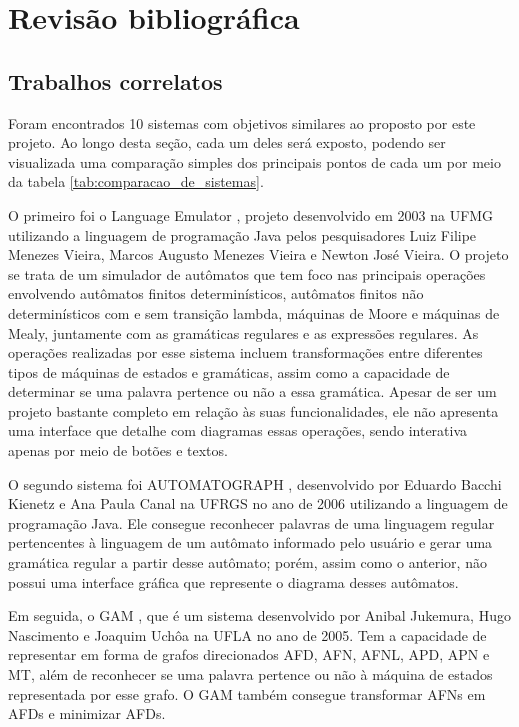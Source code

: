 \chapter{Revisão bibliográfica}
\label{cap:revisao}

\section{Trabalhos correlatos}

Foram encontrados 10 sistemas com objetivos similares ao proposto por este projeto. Ao longo desta seção, cada um deles será exposto, podendo ser visualizada uma comparação simples dos principais pontos de cada um por meio da tabela \ref{tab:comparacao_de_sistemas}.

O primeiro foi o Language Emulator \cite{LanguageEmulator}, projeto desenvolvido em 2003 na UFMG utilizando a linguagem de programação Java pelos pesquisadores Luiz Filipe Menezes Vieira, Marcos Augusto Menezes Vieira e Newton José Vieira. O projeto se trata de um simulador de autômatos que tem foco nas principais operações envolvendo autômatos finitos determinísticos, autômatos finitos não determinísticos com e sem transição lambda, máquinas de Moore e máquinas de Mealy, juntamente com as gramáticas regulares e as expressões regulares. As operações realizadas por esse sistema incluem transformações entre diferentes tipos de máquinas de estados e gramáticas, assim como a capacidade de determinar se uma palavra pertence ou não a essa gramática. Apesar de ser um projeto bastante completo em relação às suas funcionalidades, ele não apresenta uma interface que detalhe com diagramas essas operações, sendo interativa apenas por meio de botões e textos.

O segundo sistema foi AUTOMATOGRAPH \cite{AUTOMATOGRAPH}, desenvolvido por Eduardo Bacchi Kienetz e Ana Paula Canal na UFRGS no ano de 2006 utilizando a linguagem de programação Java. Ele consegue reconhecer palavras de uma linguagem regular pertencentes à linguagem de um autômato informado pelo usuário e gerar uma gramática regular a partir desse autômato; porém, assim como o anterior, não possui uma interface gráfica que represente o diagrama desses autômatos.

Em seguida, o \ac{GAM} \cite{GAM}, que é um sistema desenvolvido por Anibal Jukemura, Hugo Nascimento e Joaquim Uchôa na UFLA no ano de 2005. Tem a capacidade de representar em forma de grafos direcionados \ac{AFD}, \ac{AFN}, \ac{AFNL}, \ac{APD}, \ac{APN} e \ac{MT}, além de reconhecer se uma palavra pertence ou não à máquina de estados representada por esse grafo. O GAM também consegue transformar AFNs em AFDs e minimizar AFDs.

